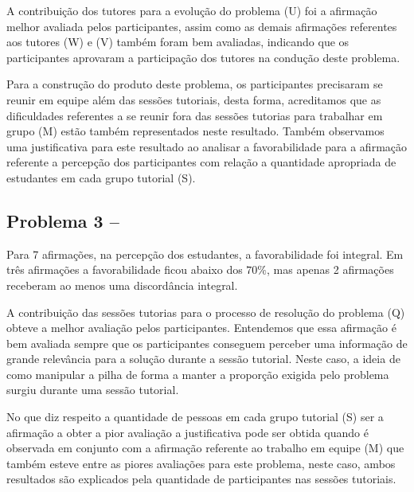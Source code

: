 A contribuição dos tutores para a evolução do problema (U) foi a
afirmação melhor avaliada pelos participantes, assim como as demais
afirmações referentes aos tutores (W) e (V) também foram bem avaliadas,
indicando que os participantes aprovaram a participação
dos tutores na condução deste problema.

Para a construção do produto deste problema, os participantes
precisaram se reunir em equipe além das sessões tutoriais, desta forma,
acreditamos que as dificuldades referentes a se reunir fora das sessões tutorias
para trabalhar em grupo (M) estão também representados neste resultado.
Também observamos uma justificativa para este resultado ao analisar a favorabilidade para
a afirmação referente a percepção dos participantes com relação a quantidade
apropriada de estudantes em cada grupo tutorial (S).


\subsection{Problema 3 -- \ProblemaC}

Para 7 afirmações, na percepção dos estudantes, a favorabilidade foi integral.
Em três afirmações a favorabilidade ficou abaixo dos $70\%$, mas apenas 2
afirmações receberam ao menos uma discordância integral.

A contribuição das sessões tutorias para o processo
de resolução do problema (Q) obteve a melhor avaliação pelos
participantes.
Entendemos que essa afirmação é bem avaliada sempre que
os participantes conseguem perceber uma informação de
grande relevância para a solução durante a sessão
tutorial.
Neste caso, a ideia de como manipular a pilha
de forma a manter a proporção exigida pelo problema
surgiu durante uma sessão tutorial.

No que diz respeito a quantidade de pessoas em
cada grupo tutorial (S) ser a afirmação a obter a pior
avaliação a justificativa pode ser obtida quando
é observada em conjunto com a afirmação referente ao
trabalho em equipe (M) que também esteve entre
as piores avaliações para este problema, neste caso,
ambos resultados são explicados pela quantidade de
participantes nas sessões tutoriais.


